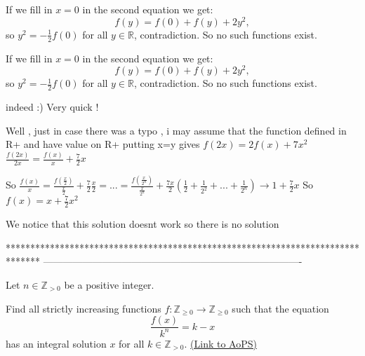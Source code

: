 \begin{solution}
	If we fill in $ x=0$ in the second equation we get:
\[ f(y) = f(0) + f(y) + 2y^2,\]
so $ y^2 = -\frac{1}{2}f(0)$ for all $ y \in \mathbb{R}$, contradiction.
So no such functions exist.
\end{solution}



\begin{solution}
	\begin{tcolorbox}If we fill in $ x = 0$ in the second equation we get:
\[ f(y) = f(0) + f(y) + 2y^2,\]
so $ y^2 = - \frac {1}{2}f(0)$ for all $ y \in \mathbb{R}$, contradiction.
So no such functions exist.\end{tcolorbox}
indeed :)
Very quick !
\end{solution}



\begin{solution}
	Well , just in case there was a typo , i may assume that the function defined in R+ and have value on R+
putting x=y gives 
$ f(2x) = 2f(x) + 7x^2$
$ \frac {f(2x)}{2x} = \frac {f(x)}{x} + \frac {7}{2}x$

So
$ \frac {f(x)}{x} = \frac {f(\frac {x}{2})}{\frac {x}{2}} + \frac {7}{2}\frac {x}{2} = ... = \frac {f(\frac {x}{2^n})}{\frac {x}{2^n}} + \frac {7x}{2}(\frac {1}{2} + \frac {1}{2^2} + ... + \frac {1}{2^n} ) \rightarrow 1 + \frac {7}{2}x$
So $ f(x) = x + \frac {7}{2}x^2$

We notice that this solution doesnt work so there is no solution
\end{solution}
*******************************************************************************
-------------------------------------------------------------------------------

\begin{problem}
	Let $ n \in \mathbb{Z}_{ > 0}$ be a positive integer.

Find all strictly increasing functions $ f: \mathbb{Z}_{\geq 0} \rightarrow \mathbb{Z}_{\geq 0}$ such that the equation
\[ \frac {f(x)}{k^n} = k - x\]
has an integral solution $ x$ for all $ k \in \mathbb{Z}_{ > 0}$.
	\flushright \href{https://artofproblemsolving.com/community/c6h321004}{(Link to AoPS)}
\end{problem}



